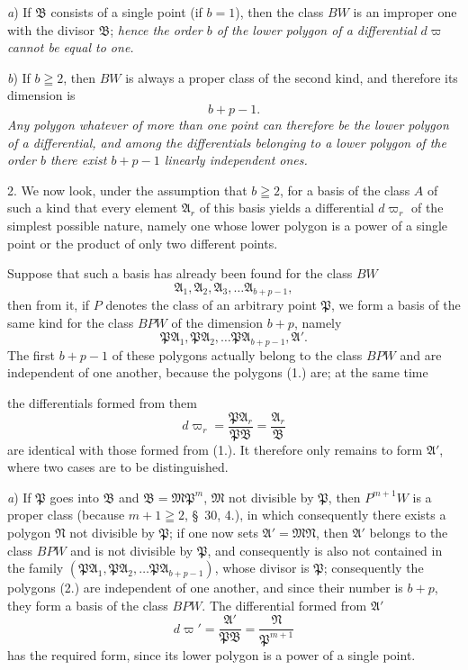 \documentclass{article}
\begin{document}
\emph{a}) If $\mathfrak{B}$ consists of a single point (if $b = 1$), then the class $BW$ is an improper one with the divisor $\mathfrak{B}$; \emph{hence the order $b$ of the lower polygon of a differential $d\varpi$ cannot be equal to one.}

\emph{b}) If $b \geqq 2$, then $BW$ is always a proper class of the second kind, and therefore its dimension is
\[ b+p-1. \]
\emph{Any polygon whatever of more than one point can therefore be the lower polygon of a differential, and among the differentials belonging to a lower polygon of the order $b$ there exist $b+p-1$ linearly independent ones.}

2. We now look, under the assumption that $b \geqq 2$, for a basis of the class $A$ of such a kind that every element $\mathfrak{A}_{r}$ of this basis yields a differential $d\varpi_{r}$ of the simplest possible nature, namely one whose lower polygon is a power of a single point or the product of only two different points.

Suppose that such a basis has already been found for the class $BW$
\[ \mathfrak{A}_{1}, \mathfrak{A}_{2}, \mathfrak{A}_{3}, \ldots \mathfrak{A}_{b+p-1}, \tag{1.} \]
then from it, if $P$ denotes the class of an arbitrary point $\mathfrak{P}$, we form a basis of the same kind for the class $BPW$ of the dimension $b+p$, namely
\[ \mathfrak{P}\mathfrak{A}_{1}, \mathfrak{P}\mathfrak{A}_{2}, \ldots \mathfrak{P}\mathfrak{A}_{b+p-1}, \mathfrak{A}'. \tag{2.} \]
The first $b+p-1$ of these polygons actually belong to the class $BPW$ and are independent of one another, because the polygons (1.) are; at the same time

the differentials formed from them
\[ d\varpi_{r} = \frac{\mathfrak{P}\mathfrak{A}_{r}}{\mathfrak{P}\mathfrak{B}} = \frac{\mathfrak{A}_{r}}{\mathfrak{B}} \]
are identical with those formed from (1.). It therefore only remains to form $\mathfrak{A}'$, where two cases are to be distinguished.

\emph{a}) If $\mathfrak{P}$ goes into $\mathfrak{B}$ and $\mathfrak{B} = \mathfrak{M}\mathfrak{P}^{m}$, $\mathfrak{M}$ not divisible by $\mathfrak{P}$, then $P^{m+1}W$ is a proper class (because $m+1 \geqq 2$, §~30, 4.), in which consequently there exists a polygon $\mathfrak{N}$ not divisible by $\mathfrak{P}$; if one now sets $\mathfrak{A}' = \mathfrak{M}\mathfrak{N}$, then $\mathfrak{A}'$ belongs to the class $BPW$ and is not divisible by $\mathfrak{P}$, and consequently is also not contained in the family $(\mathfrak{P}\mathfrak{A}_{1}, \mathfrak{P}\mathfrak{A}_{2}, \ldots \mathfrak{P}\mathfrak{A}_{b+p-1})$, whose divisor is $\mathfrak{P}$; consequently the polygons (2.) are independent of one another, and since their number is $b+p$, they form a basis of the class $BPW$. The differential formed from $\mathfrak{A}'$
\[ d\varpi' = \frac{\mathfrak{A}'}{\mathfrak{P}\mathfrak{B}} = \frac{\mathfrak{N}}{\mathfrak{P}^{m+1}} \]
has the required form, since its lower polygon is a power of a single point.
\end{document}
